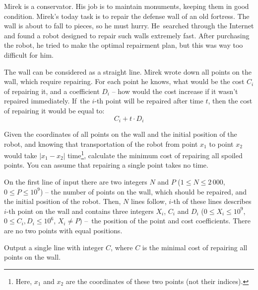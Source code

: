 





Mirek is a conservator.
His job is to maintain monuments, keeping them in good condition.
Mirek's today task is to repair the defense wall of an old fortress.
The wall is about to fall to pieces, so he must hurry.
He~searched through the Internet and found a robot designed to repair such walls extremely fast.
After purchasing the robot, he tried to make the optimal repairment plan, but this was way too difficult for him.

The wall can be considered as a straight line.
Mirek wrote down all points on the wall, which require repairing.
For each point he knows, what would be the cost $C_i$ of repairing it, and a coefficient $D_i$
	-- how would the cost increase if it wasn't repaired immediately.
If~the $i$-th point will be repaired after time $t$, then the cost of repairing it would be equal to:
\[ C_i + t \cdot D_i \]


Given the coordinates of all points on the wall and the initial position of the robot,
	and knowing that transportation of the robot from
	point $x_1$ to point $x_2$ would take $|x_1 - x_2|$
	time\footnote{Here, $x_1$ and $x_2$ are the coordinates of these two points (not their indices).},
	calculate the minimum cost of repairing all spoiled points.
You can assume that repairing a single point takes no time.


On the first line of input there are two integers $N$ and $P$ ($1 \le N \le 2\,000$, $0 \le P \le 10^9$)
	-- the number of points on the wall, which should be repaired, and the initial position of the robot.
Then, $N$ lines follow, $i$-th of these lines describes $i$-th point on the wall
	and contains three integers $X_i$, $C_i$ and $D_i$ ($0 \le X_i \le 10^9$, $0 \le C_i, D_i \le 10^6$, $X_i \neq P$)
	--~the position of the point and cost coefficients.
There are no two points with equal positions.


Output a single line with integer $C$, where $C$ is the minimal cost of repairing
	all points on the wall.



